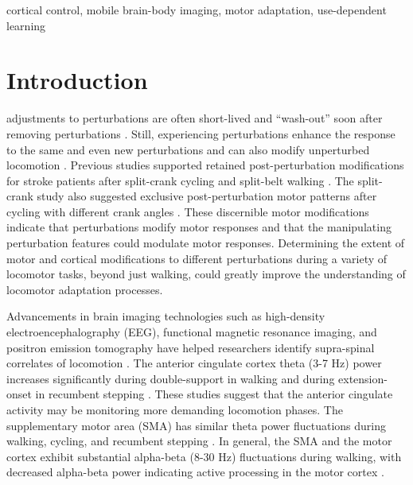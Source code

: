 \documentclass[shortpaper,twoside,web]{ieeecolor}
\begin{document}
\begin{IEEEkeywords}
cortical control, mobile brain-body imaging, motor adaptation, use-dependent learning
\end{IEEEkeywords}

\section{Introduction}
\label{sec:introduction}
 adjustments to perturbations are often short-lived and “wash-out” soon after removing perturbations \cite{Torres-Oviedo2011-tv,Huang2012-dr}. Still, experiencing perturbations enhance the response to the same and even new perturbations and can also modify unperturbed locomotion \cite{Leech2018-sr}. Previous studies supported retained post-perturbation modifications for stroke patients after split-crank cycling and split-belt walking \cite{Alibiglou2011-sc,Maclellan2014-vk}. The split-crank study also suggested exclusive post-perturbation motor patterns after cycling with different crank angles \cite{Alibiglou2011-sc}. These discernible motor modifications indicate that perturbations modify motor responses and that the manipulating perturbation features could modulate motor responses. Determining the extent of motor and cortical modifications to different perturbations during a variety of locomotor tasks, beyond just walking, could greatly improve the understanding of locomotor adaptation processes.

Advancements in brain imaging technologies such as high-density electroencephalography (EEG), functional magnetic resonance imaging, and positron emission tomography have helped researchers identify supra-spinal correlates of locomotion \cite{Gramann2011-yj,Enders2016-id,Hinton2019-gg}. The anterior cingulate cortex theta (3-7 Hz) power increases significantly during double-support in walking and during extension-onset in recumbent stepping \cite{Gramann2011-yj,Bradford2016-kp,Kline2016-ci}. These studies suggest that the anterior cingulate activity may be monitoring more demanding locomotion phases. The supplementary motor area (SMA) has similar theta power fluctuations during walking, cycling, and recumbent stepping \cite{Gramann2011-yj,Jaeger2014-ao,Kline2016-ci}. In general, the SMA and the motor cortex exhibit substantial alpha-beta (8-30 Hz) fluctuations during walking, with decreased alpha-beta power indicating active processing in the motor cortex \cite{Nordin2019-gd}.
\end{document}
